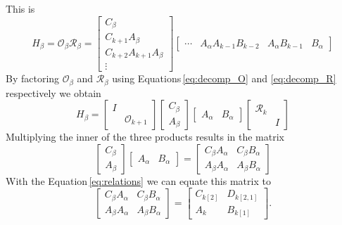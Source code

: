\documentclass[doctype=mastersthesis,BCOR=15mm,biblatex]{ldvbook}%
\newcommand{\R}{\mathcal{R}} %
\newcommand{\Ob}{\mathcal{O}} %
\newcommand{\eye}{I} %
\begin{document}
This is 
\begin{equation}
	H_\beta = \Ob_\beta \R_\beta 
	= \begin{bmatrix} C_\beta \\ C_{k+1} A_\beta \\ C_{k+2} A_{k+1} A_\beta \\ \vdots \end{bmatrix}
	\begin{bmatrix} \cdots& A_\alpha A_{k-1}B_{k-2} & A_\alpha B_{k-1}&  B_\alpha  \end{bmatrix}
\end{equation}
By factoring $ \Ob_\beta $ and $\R_\beta $ using Equations\,\ref{eq:decomp_O} and \ref{eq:decomp_R} respectively we obtain
\begin{equation}
	H_\beta
	= \begin{bmatrix} \eye &\\ & \mathcal{O}_{k+1} \end{bmatrix} \begin{bmatrix} C_\beta \\  A_\beta \end{bmatrix}
	\begin{bmatrix} A_\alpha &  B_\alpha  \end{bmatrix} \begin{bmatrix} \mathcal{R}_k\\&\eye \end{bmatrix}
\end{equation}
Multiplying the inner of the three products results in the matrix
\begin{equation}
	\begin{bmatrix} C_\beta \\  A_\beta \end{bmatrix}
	\begin{bmatrix} A_\alpha &  B_\alpha  \end{bmatrix}
	=
	\begin{bmatrix}
		C_\beta A_\alpha & C_\beta B_\alpha\\
		A_\beta A_\alpha & A_\beta B_\alpha
	\end{bmatrix}
\end{equation}
With the Equation\,\ref{eq:relations} we can equate this matrix to 
\begin{equation}
	\begin{bmatrix}
	C_\beta A_\alpha & C_\beta B_\alpha\\
	A_\beta A_\alpha & A_\beta B_\alpha
	\end{bmatrix}
	=
	\begin{bmatrix}
	C_{k[2]} & D_{k[2,1]}\\
	A_k & B_{k[1]}
	\end{bmatrix}
	.
\end{equation}
\end{document}
